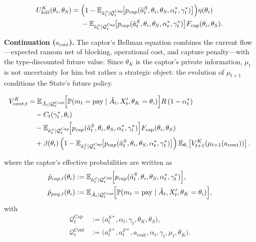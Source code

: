\documentclass[12pt,a4paper]{article}
\theoremstyle{plain}
\theoremstyle{definition}
\theoremstyle{remark}
\newcommand{\ProbE}{\mathbb{P}}
\newcommand{\E}{\mathbb{E}}
\newcommand{\1}{\mathbf{1}}
\begin{document}
\begin{equation}
\label{eq:kidnapper-kill}
\begin{split}
U^K_{kill}(\theta_i, \theta_S)
={}& \Bigl(1-\E_{\tilde a_t^S\mid \mathcal Q_t^{\mathrm{Cap}}}\!\bigl[
      p_{cap}(\tilde a_t^S,\theta_i,\theta_S,\alpha_t^\ast,\gamma_t^\ast)
    \bigr]\Bigr)\eta(\theta_i) \\
&{}-\E_{\tilde a_t^S\mid \mathcal Q_t^{\mathrm{Cap}}}\!\bigl[
      p_{cap}(\tilde a_t^S,\theta_i,\theta_S,\alpha_t^\ast,\gamma_t^\ast)
    \bigr]F_{\mathrm{cap}}(\theta_i,\theta_S).
\end{split}
\end{equation}

\noindent \textbf{Continuation ($a_{cont}$).} The captor's Bellman equation combines the current flow---expected ransom net of blocking, operational cost, and capture penalty---with the type-discounted future value. Since $\theta_K$ is the captor's private information, $\mu_t$ is not uncertainty for him but rather a strategic object: the evolution of $\mu_{t+1}$ conditions the State's future policy.

\begin{equation}
  \label{eq:kidnapper-cont}
  \begin{aligned}
  V^K_{cont,t}
  &=
    \E_{\tilde A_t\mid \mathcal Q_t^{\mathrm{Cont}}}\!\Bigl[
      \ProbE(m_t=\mathrm{pay}\mid \tilde A_t,X_t',\theta_K=\theta_i)
    \Bigr] R\, (1 - \alpha_t^\ast) \\
  &\quad - C_t(\gamma_t^\ast, \theta_i) \\
  &\quad - \E_{\tilde a_t^S\mid \mathcal Q_t^{\mathrm{Cap}}}\!\Bigl[
      p_{cap}(\tilde a_t^S,\theta_i,\theta_S,\alpha_t^\ast,\gamma_t^\ast)
    \Bigr] F_{\mathrm{cap}}(\theta_i,\theta_S) \\
  &\quad +
    \beta(\theta_i)\,\Bigl(1-\E_{\tilde a_t^S\mid \mathcal Q_t^{\mathrm{Cap}}}\!\bigl[
      p_{cap}(\tilde a_t^S,\theta_i,\theta_S,\alpha_t^\ast,\gamma_t^\ast)
    \bigr]\Bigr)\,
    \E_{\theta_i}\!\left[
      V^K_{t+1}\!\left(\mu_{t+1}(a_{cont})\right)
    \right].
  \end{aligned}
\end{equation}

\noindent where the captor's effective probabilities are written as
\begin{align}
\tilde{p}_{cap,t}(\theta_i)
&:= \E_{\tilde a_t^S\mid \mathcal Q_t^{\mathrm{Cap}}}\!\Bigl[
    p_{cap}(\tilde a_t^S,\theta_i,\theta_S,\alpha_t^\ast,\gamma_t^\ast)
  \Bigr], \\
\tilde{p}_{pay,t}(\theta_i)
&:= \E_{\tilde A_t\mid \mathcal Q_t^{\mathrm{Cont}}}\!\Bigl[
    \ProbE(m_t=\mathrm{pay}\mid \tilde A_t,X_t',\theta_K=\theta_i)
  \Bigr],
\end{align}
with
\[
\begin{aligned}
\mathcal Q_t^{\mathrm{Cap}}
&:=
\bigl(a_t^{S\ast},\alpha_t,\gamma_t,\theta_K,\theta_S\bigr), \\
\mathcal Q_t^{\mathrm{Cont}}
&:=
\bigl(a_t^{S\ast},a_t^{F\ast},a_{\mathrm{cont}},\alpha_t,\gamma_t,\mu_t,\theta_K\bigr).
\end{aligned}
\]
\end{document}
